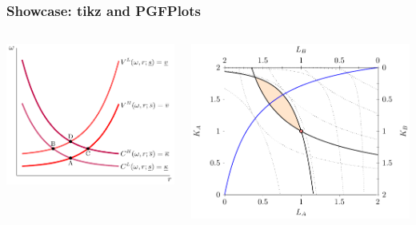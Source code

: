 \documentclass[ignorenonframetext]{beamer}
\begin{document}
\begin{frame}[fragile]
  \frametitle{Showcase: tikz and PGFPlots}
  \begin{columns}
    \begin{column}{.5\textwidth}

  \includegraphics[width = 1.0\textwidth]{CostUtility}
    \end{column}

    \begin{column}{.5\textwidth}

  \includegraphics[width = 1.0\textwidth]{vraag1e}
    \end{column}
  \end{columns}
\end{frame}
\end{document}
